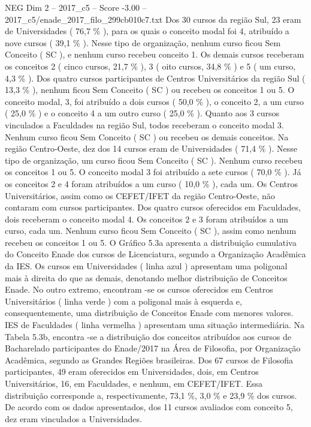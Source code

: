\begin{textsample}{NEG Dim 2 – 2017\_c5 – Score -3.00 – 2017\_c5/enade\_2017\_filo\_299cb010c7.txt}
Dos 30 cursos da região Sul, 23 eram de Universidades ( 76,7 \% ), para os quais o conceito modal foi 4, atribuído a nove cursos ( 39,1 \% ).
Nesse tipo de organização, nenhum curso ficou Sem Conceito ( SC ), e nenhum curso recebeu conceito 1.
Os demais cursos receberam os conceitos 2 ( cinco cursos, 21,7 \% ), 3 ( oito cursos, 34,8 \% ) e 5 ( um curso, 4,3 \% ).
Dos quatro cursos participantes de Centros Universitários da região Sul ( 13,3 \% ), nenhum ficou Sem Conceito ( SC ) ou recebeu os conceitos 1 ou 5.
O conceito modal, 3, foi atribuído a dois cursos ( 50,0 \% ), o conceito 2, a um curso ( 25,0 \% ) e o conceito 4 a um outro curso ( 25,0 \% ).
Quanto aos 3 cursos vinculados a Faculdades na região Sul, todos receberam o conceito modal 3.
Nenhum curso ficou Sem Conceito ( SC ) ou recebeu os demais conceitos.
Na região Centro-Oeste, dez dos 14 cursos eram de Universidades ( 71,4 \% ).
Nesse tipo de organização, um curso ficou Sem Conceito ( SC ).
Nenhum curso recebeu os conceitos 1 ou 5.
O conceito modal 3 foi atribuído a sete cursos ( 70,0 \% ).
Já os conceitos 2 e 4 foram atribuídos a um curso ( 10,0 \% ), cada um.
Os Centros Universitários, assim como os CEFET/IFET da região Centro-Oeste, não contaram com cursos participantes.
Dos quatro cursos oferecidos em Faculdades, dois receberam o conceito modal 4.
Os conceitos 2 e 3 foram atribuídos a um curso, cada um.
Nenhum curso ficou Sem Conceito ( SC ), assim como nenhum recebeu os conceitos 1 ou 5.
O Gráfico 5.3a apresenta a distribuição cumulativa do Conceito Enade dos cursos de Licenciatura, segundo a Organização Acadêmica da IES.
Os cursos em Universidades ( linha azul ) apresentam uma poligonal mais à direita do que as demais, denotando melhor distribuição de Conceitos Enade.
No outro extremo, encontram -se os cursos oferecidos em Centros Universitários ( linha verde ) com a poligonal mais à esquerda e, consequentemente, uma distribuição de Conceitos Enade com menores valores.
IES de Faculdades ( linha vermelha ) apresentam uma situação intermediária.
Na Tabela 5.3b, encontra -se a distribuição dos conceitos atribuídos aos cursos de Bacharelado participantes do Enade/2017 na Área de Filosofia, por Organização Acadêmica, segundo as Grandes Regiões brasileiras.
Dos 67 cursos de Filosofia participantes, 49 eram oferecidos em Universidades, dois, em Centros Universitários, 16, em Faculdades, e nenhum, em CEFET/IFET.
Essa distribuição corresponde a, respectivamente, 73,1 \%, 3,0 \% e 23,9 \% dos cursos.
De acordo com os dados apresentados, dos 11 cursos avaliados com conceito 5, dez eram vinculados a Universidades.

\end{textsample}
